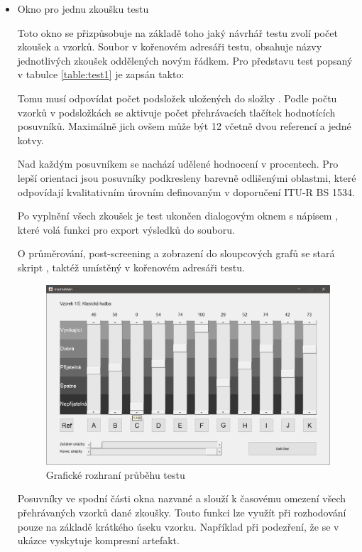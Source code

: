 \begin{itemize}
    \item Okno pro jednu zkoušku testu
    
    
Toto okno se přizpůsobuje na základě toho jaký návrhář testu zvolí počet zkoušek a vzorků. Soubor  v kořenovém adresáři testu, obsahuje názvy jednotlivých zkoušek oddělených novým řádkem. Pro představu test popsaný v tabulce \ref{table:test1} je zapsán takto:


Tomu musí odpovídat počet podsložek uložených do složky . Podle počtu vzorků v podsložkách se aktivuje počet přehrávacích tlačítek hodnotících posuvníků. Maximálně jich ovšem může být 12 včetně dvou referencí a jedné kotvy.

Nad každým posuvníkem se nachází udělené hodnocení v procentech. Pro lepší orientaci jsou posuvníky podkresleny barevně odlišenými oblastmi, které odpovídají kvalitativním úrovním definovaným v doporučení ITU-R BS 1534.

Po vyplnění všech zkoušek je test ukončen dialogovým oknem s nápisem , které volá funkci pro export výsledků do souboru.

O průměrování, post-screening a zobrazení do sloupcových grafů se stará skript , taktéž umístěný v kořenovém adresáři testu.

\begin{figure}[h]
\centering
\includegraphics[width=.95\textwidth]{pic/test.png}
\caption{Grafické rozhraní průběhu testu}
\label{pic:test}
\end{figure}

Posuvníky ve spodní části okna nazvané  a  slouží k časovému omezení všech přehrávaných vzorků dané zkoušky. Touto funkci lze využít při rozhodování pouze na základě krátkého úseku vzorku. Například při podezření, že se v ukázce vyskytuje kompresní artefakt.


\end{itemize}


